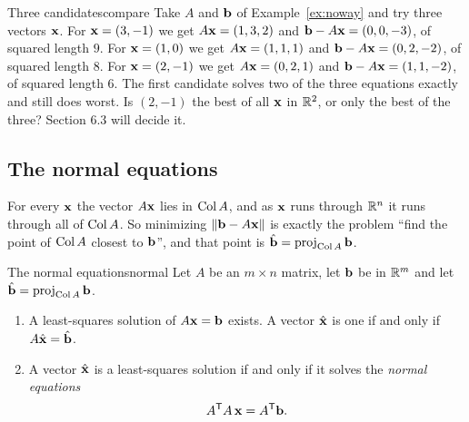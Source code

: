\documentclass[11pt]{article}
\begin{document}
\begin{exmp}{Three candidates}{compare}
Take $A$ and $\mathbf{b}$ of Example~\ref{ex:noway} and try three vectors $\mathbf{x}$. For $\mathbf{x}=(3,-1)$ we get $A\mathbf{x}=(1,3,2)$ and $\mathbf{b}-A\mathbf{x}=(0,0,-3)$, of squared length $9$. For $\mathbf{x}=(1,0)$ we get $A\mathbf{x}=(1,1,1)$ and $\mathbf{b}-A\mathbf{x}=(0,2,-2)$, of squared length $8$. For $\mathbf{x}=(2,-1)$ we get $A\mathbf{x}=(0,2,1)$ and $\mathbf{b}-A\mathbf{x}=(1,1,-2)$, of squared length $6$. The first candidate solves two of the three equations exactly and still does worst. Is $(2,-1)$ the best of all $\mathbf{x}$ in $\mathbb{R}^2$, or only the best of the three? Section 6.3 will decide it.
\end{exmp}

\subsection*{The normal equations}

For every $\mathbf{x}$ the vector $A\mathbf{x}$ lies in $\operatorname{Col} A$, and as $\mathbf{x}$ runs through $\mathbb{R}^n$ it runs through all of $\operatorname{Col} A$. So minimizing $\lVert\mathbf{b}-A\mathbf{x}\rVert$ is exactly the problem ``find the point of $\operatorname{Col} A$ closest to $\mathbf{b}$'', and that point is $\hat{\mathbf{b}}=\operatorname{proj}_{\operatorname{Col} A}\mathbf{b}$.

\begin{thm}{The normal equations}{normal}
Let $A$ be an $m\times n$ matrix, let $\mathbf{b}$ be in $\mathbb{R}^m$ and let $\hat{\mathbf{b}}=\operatorname{proj}_{\operatorname{Col} A}\mathbf{b}$.
\begin{enumerate}[label=(\alph*),itemsep=1pt]
  \item A least-squares solution of $A\mathbf{x}=\mathbf{b}$ exists. A vector $\hat{\mathbf{x}}$ is one if and only if $A\hat{\mathbf{x}}=\hat{\mathbf{b}}$.
  \item A vector $\hat{\mathbf{x}}$ is a least-squares solution if and only if it solves the \emph{normal equations}
  \[
  A^{\mathsf T} A\,\mathbf{x}=A^{\mathsf T}\mathbf{b}.
  \]
\end{enumerate}
\end{thm}
\end{document}
